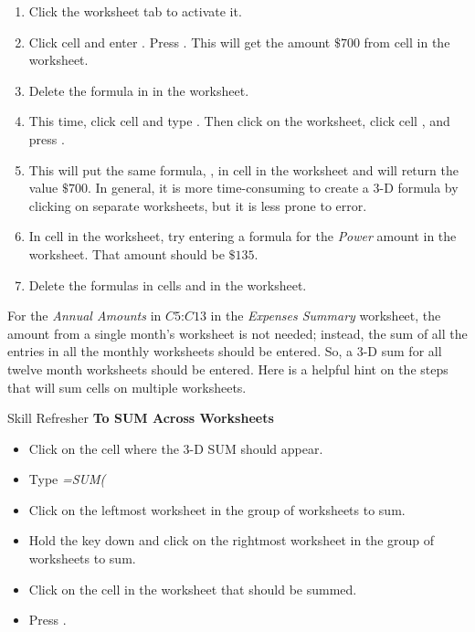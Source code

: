 \begin{enumerate}
	\item Click the  worksheet tab to activate it.
	\item Click cell  and enter . Press . This will get the amount $ \$700 $ from cell  in the  worksheet.
	\item Delete the formula in  in the  worksheet.
	\item This time, click cell  and type \fmtTyping{=}. Then click on the  worksheet, click cell , and press .
	\item This will put the same formula, , in cell  in the  worksheet and will return the value $ \$700 $. In general, it is more time-consuming to create a $ 3 $-D formula by clicking on separate worksheets, but it is less prone to error.
	\item In cell  in the  worksheet, try entering a formula for the \textit{Power} amount in the  worksheet. That amount should be $ \$135 $.
	\item Delete the formulas in cells  and  in the  worksheet.
\end{enumerate}

For the \textit{Annual Amounts} in $ C5 $:$ C13 $ in the \textit{Expenses Summary} worksheet, the amount from a single month's worksheet is not needed; instead, the sum of all the entries in all the monthly worksheets should be entered. So, a $ 3 $-D sum for all twelve month worksheets should be entered. Here is a helpful hint on the steps that will sum cells on multiple worksheets.

\begin{center}
	\begin{sklbox}{Skill Refresher}
		\textbf{To SUM Across Worksheets}
		\\
		\begin{itemize}
			\setlength{\itemsep}{0pt}
			\setlength{\parskip}{0pt}
			\setlength{\parsep}{0pt}
			
			\item Click on the cell where the $ 3 $-D SUM should appear.
			\item Type \textit{=SUM(}
			\item Click on the leftmost worksheet in the group of worksheets to sum.
			\item Hold the  key down and click on the rightmost worksheet in the group of worksheets to sum.
			\item Click on the cell in the worksheet that should be summed.
			\item Press .
			
		\end{itemize}
	\end{sklbox}
\end{center}

